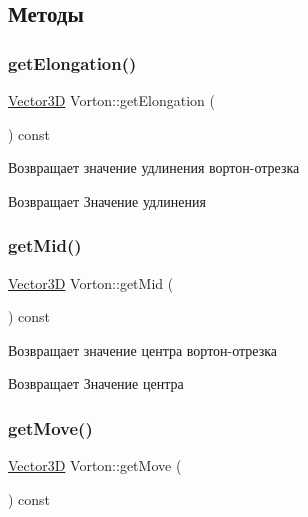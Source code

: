 \subsection{Методы}
\mbox{\label{class_vorton_a4bb2c538b74dd47deb784e3ef3f86eed}} 
\subsubsection{\texorpdfstring{get\+Elongation()}{getElongation()}}
{\footnotesize\ttfamily \mbox{\hyperlink{class_vector3_d}{Vector3D}} Vorton\+::get\+Elongation (\begin{DoxyParamCaption}{ }\end{DoxyParamCaption}) const}

Возвращает значение удлинения вортон-\/отрезка \begin{DoxyReturn}{Возвращает}
Значение удлинения 
\end{DoxyReturn}
\mbox{\label{class_vorton_a3dfd18d1d932adfb498c10b1ce9c669c}} 
\subsubsection{\texorpdfstring{get\+Mid()}{getMid()}}
{\footnotesize\ttfamily \mbox{\hyperlink{class_vector3_d}{Vector3D}} Vorton\+::get\+Mid (\begin{DoxyParamCaption}{ }\end{DoxyParamCaption}) const}

Возвращает значение центра вортон-\/отрезка \begin{DoxyReturn}{Возвращает}
Значение центра 
\end{DoxyReturn}
\mbox{\label{class_vorton_a607fd1efecaf9c2f1623f8b2b93eebce}} 
\subsubsection{\texorpdfstring{get\+Move()}{getMove()}}
{\footnotesize\ttfamily \mbox{\hyperlink{class_vector3_d}{Vector3D}} Vorton\+::get\+Move (\begin{DoxyParamCaption}{ }\end{DoxyParamCaption}) const}

